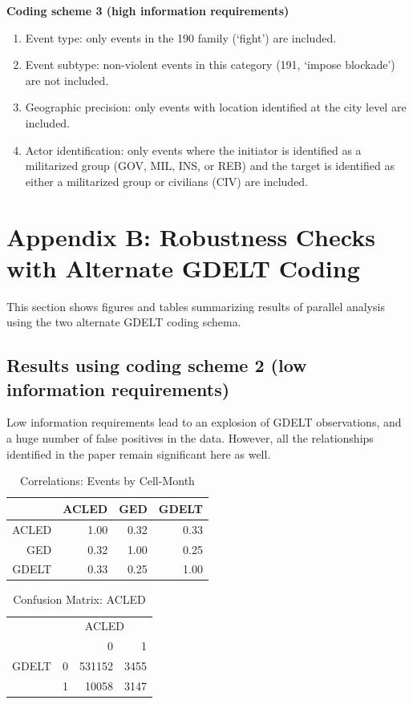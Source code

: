 \documentclass[hidelinks]{article}
\begin{document}
\textbf{Coding scheme 3 (high information requirements)}
\begin{enumerate}
\item Event type: only events in the 190 family (`fight') are included.
\item Event subtype: non-violent events in this category (191, `impose blockade') are not included.
\item Geographic precision: only events with location identified at the city level are included.
\item Actor identification: only events where the initiator is identified as a militarized group (GOV, MIL, INS, or REB) and the target is identified as either a militarized group or civilians (CIV) are included.
\end{enumerate}

\pagebreak

\section*{Appendix B: Robustness Checks with Alternate GDELT Coding}
This section shows figures and tables summarizing results of parallel analysis using the two alternate GDELT coding schema.

\subsection{Results using coding scheme 2 (low information requirements)}
Low information requirements lead to an explosion of GDELT observations, and a huge number of false positives in the data. However, all the relationships identified in the paper remain significant here as well.

\begin{table}[ht]
\centering
\begin{tabular}{rrrr}
  \hline
 & ACLED & GED & GDELT\\ 
  \hline
ACLED & 1.00 & 0.32 & 0.33 \\ 
GED & 0.32 & 1.00 & 0.25 \\ 
GDELT & 0.33 & 0.25 & 1.00 \\ 
   \hline
\end{tabular}
\caption{Correlations: Events by Cell-Month} 
\end{table}

\begin{table}[ht]
\centering
\begin{tabular}{rrrr}
  \hline
   &  \multicolumn{3}{c}{ACLED}\\
& & 0 & 1 \\ 
  \hline
GDELT & 0 & 531152 & 3455 \\ 
 &  1 & 10058 & 3147 \\ 
   \hline
\end{tabular}
\caption{Confusion Matrix: ACLED} 
\end{table}
\end{document}
